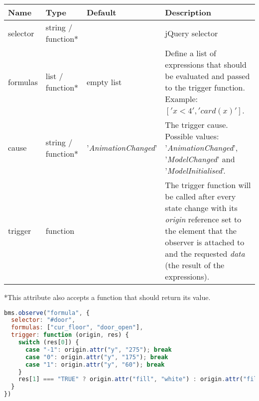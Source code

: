\begin{tabular}{ l l l p{7cm} }
  \textbf{Name} & \textbf{Type} & \textbf{Default} & \textbf{Description} \\
  \hline\noalign{\medskip}
  selector & string / function* & & jQuery selector \\
  \hline\noalign{\medskip}
  formulas & list / function* & empty list & Define a list of expressions that should be evaluated and passed to the trigger function. Example: $['x < 4', 'card(x)']$.\\
  \hline\noalign{\medskip}
  cause & string / function* & '\textit{AnimationChanged}' & The trigger cause. Possible values: '\textit{AnimationChanged}', '\textit{ModelChanged}' and '\textit{ModelInitialised}'. \\
  \hline\noalign{\medskip}
  trigger & function &  & The trigger function will be called after every state change with its \textit{origin} reference set to the element that the observer is attached to and the requested \textit{data} (the result of the expressions). \\
\end{tabular}

*This attribute also accepts a function that should return its value.

\begin{lstlisting}[language=JavaScript]
bms.observe("formula", {
  selector: "#door",
  formulas: ["cur_floor", "door_open"],
  trigger: function (origin, res) {
    switch (res[0]) {
      case "-1": origin.attr("y", "275"); break
      case "0": origin.attr("y", "175"); break
      case "1": origin.attr("y", "60"); break
    }
    res[1] === "TRUE" ? origin.attr("fill", "white") : origin.attr("fill", "lightgray")
  }
})
\end{lstlisting}

